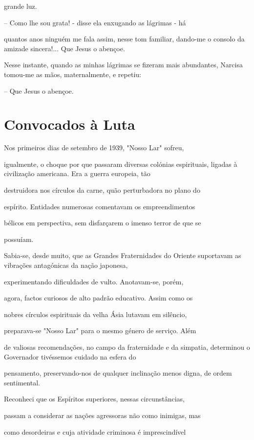 \documentclass[portuguese,12pt,a4paper]{scrbook}
\begin{document}
	grande luz.
	
	– Como lhe sou grata! - disse ela enxugando as lágrimas - há
	
	quantos anos ninguém me fala assim, nesse tom familiar, dando-me o consolo da amizade sincera!... Que Jesus o abençoe.
	
	Nesse instante, quando as minhas lágrimas se fizeram mais abundantes, Narcisa tomou-me as mãos, maternalmente, e repetiu:
	
	– Que Jesus o abençoe.
	
	
	\chapter{Convocados à Luta}
	
	Nos primeiros dias de setembro de 1939, "Nosso Lar" sofreu,
	
	igualmente, o choque por que passaram diversas colónias espirituais, ligadas à civilização americana. Era a guerra europeia, tão
	
	destruidora nos círculos da carne, quão perturbadora no plano do
	
	espírito. Entidades numerosas comentavam os empreendimentos
	
	bélicos em perspectiva, sem disfarçarem o imenso terror de que se
	
	possuíam.
	
	Sabia-se, desde muito, que as Grandes Fraternidades do Oriente suportavam as vibrações antagónicas da nação japonesa,
	
	experimentando dificuldades de vulto. Anotavam-se, porém,
	
	agora, factos curiosos de alto padrão educativo. Assim como os
	
	nobres círculos espirituais da velha Ásia lutavam em silêncio,
	
	preparava-se "Nosso Lar" para o mesmo género de serviço. Além
	
	de valiosas recomendações, no campo da fraternidade e da simpatia, determinou o Governador tivéssemos cuidado na esfera do
	
	pensamento, preservando-nos de qualquer inclinação menos digna, de ordem sentimental.
	
	Reconheci que os Espíritos superiores, nessas circunstâncias,
	
	passam a considerar as nações agressoras não como inimigas, mas
	
	como desordeiras e cuja atividade criminosa é imprescindível
	
\end{document}
